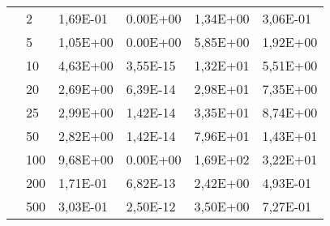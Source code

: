\begin{longtable}[c]{|p{3.5cm}|l|l|l|l|l|}
                                       & 2         & 1,69E-01 & 0.00E+00 & 1,34E+00 & 3,06E-01 \\ \cline{2-6} 
                                       & 5         & 1,05E+00 & 0.00E+00 & 5,85E+00 & 1,92E+00 \\ \cline{2-6} 
                                       & 10        & 4,63E+00 & 3,55E-15 & 1,32E+01 & 5,51E+00 \\ \cline{2-6} 
                                       & 20        & 2,69E+00 & 6,39E-14 & 2,98E+01 & 7,35E+00 \\ \cline{2-6} 
                                       & 25        & 2,99E+00 & 1,42E-14 & 3,35E+01 & 8,74E+00 \\ \cline{2-6} 
                                       & 50        & 2,82E+00 & 1,42E-14 & 7,96E+01 & 1,43E+01 \\ \cline{2-6} 
                                       & 100       & 9,68E+00 & 0.00E+00 & 1,69E+02 & 3,22E+01 \\ \cline{2-6} 
                                       & 200       & 1,71E-01 & 6,82E-13 & 2,42E+00 & 4,93E-01 \\ \cline{2-6} 
                                       & 500       & 3,03E-01 & 2,50E-12 & 3,50E+00 & 7,27E-01 \\ \hline
\end{longtable}

